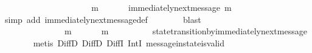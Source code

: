 \begin{isabellebody}
\ \ \ \ \isamarkupfalse%
\ \isamarkupfalse%
\ {\isachardoublequoteopen}{\isasymforall}\ {\isasymsigma}\ {\isasymin}\ {\isasymSigma}{\isachardot}\ {\isasymforall}\ {\isasymsigma}{\isacharprime}\ {\isasymin}\ {\isasymSigma}{\isachardot}\ {\isasymnot}\ {\isasymsigma}\ {\isasymsubseteq}\ {\isasymsigma}{\isacharprime}\ {\isasymlongrightarrow}\ {\isacharparenleft}{\isasymexists}\ m\ {\isasymin}\ {\isasymsigma}\ {\isacharminus}\ {\isacharparenleft}{\isasymsigma}\ {\isasyminter}\ {\isasymsigma}{\isacharprime}{\isacharparenright}{\isachardot}\ immediately{\isacharunderscore}next{\isacharunderscore}message{\isacharparenleft}{\isasymsigma}{\isacharprime}{\isacharcomma}\ m{\isacharparenright}{\isacharparenright}{\isachardoublequoteclose}\isanewline
\ \ \ \ \ \ \isamarkupfalse%
\ {\isacharparenleft}simp\ add{\isacharcolon}\ immediately{\isacharunderscore}next{\isacharunderscore}message{\isacharunderscore}def{\isacharparenright}\isanewline
\ \ \ \ \ \ \isamarkupfalse%
\ blast\ \ \isanewline
\ \ \ \ \isamarkupfalse%
\ \isamarkupfalse%
\ {\isachardoublequoteopen}{\isasymforall}\ {\isasymsigma}\ {\isasymin}\ {\isasymSigma}{\isachardot}\ {\isasymforall}\ {\isasymsigma}{\isacharprime}\ {\isasymin}\ {\isasymSigma}{\isachardot}\ {\isasymnot}\ {\isasymsigma}\ {\isasymsubseteq}\ {\isasymsigma}{\isacharprime}\ {\isasymlongrightarrow}\ {\isacharparenleft}{\isasymexists}\ m\ {\isasymin}\ {\isasymsigma}\ {\isacharminus}\ {\isasymsigma}{\isacharprime}{\isachardot}\ {\isasymsigma}{\isacharprime}\ {\isasymunion}\ {\isacharbraceleft}m{\isacharbraceright}\ {\isasymin}\ {\isasymSigma}{\isacharparenright}{\isachardoublequoteclose}\isanewline
\ \ \ \ \ \ \isamarkupfalse%
\ state{\isacharunderscore}transition{\isacharunderscore}by{\isacharunderscore}immediately{\isacharunderscore}next{\isacharunderscore}message\isanewline
\ \ \ \ \ \ \isamarkupfalse%
\ {\isacharparenleft}metis\ DiffD{}\ DiffD{}\ DiffI\ IntI\ message{\isacharunderscore}in{\isacharunderscore}state{\isacharunderscore}is{\isacharunderscore}valid{\isacharparenright}\ \ \ \ \ \ \isanewline
\ \ \ \ \isamarkupfalse%
\ {\isachardoublequoteopen}{\isasymforall}\ {\isasymsigma}\ {\isasymin}\ {\isasymSigma}{\isachardot}\ {\isasymforall}\ {\isasymsigma}{\isacharprime}\ {\isasymin}\ {\isasymSigma}{\isachardot}\ {\isasymnot}\ {\isasymsigma}\ {\isasymsubseteq}\ {\isasymsigma}{\isacharprime}\ {\isasymlongrightarrow}\ \ {\isasymsigma}\ {\isasymunion}\ {\isasymsigma}{\isacharprime}\ {\isasymin}\ {\isasymSigma}{\isachardoublequoteclose}\isanewline

\end{isabellebody}
